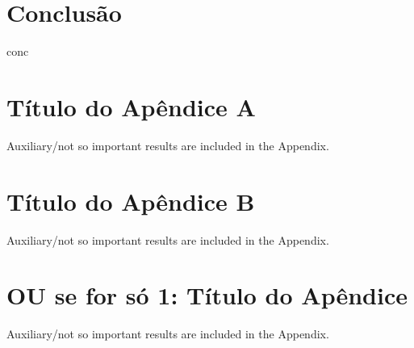 \documentclass[journal]{IEEEtran}
\begin{document}
\section{Conclusão}

conc




\appendices
\section{Título do Apêndice A}
Auxiliary/not so important results are included in the Appendix.

\section{Título do Apêndice B}
Auxiliary/not so important results are included in the Appendix.

\appendix
\section{OU se for só 1: Título do Apêndice}
Auxiliary/not so important results are included in the Appendix.
\end{document}
